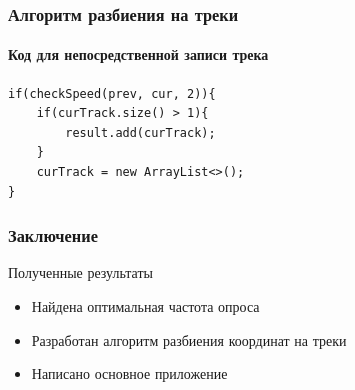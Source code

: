 \documentclass[hyperref={unicode}]{beamer}
\begin{document}
\begin{frame}[fragile]
\frametitle{Алгоритм разбиения на треки}
\framesubtitle{Код для непосредственной записи трека}

\begin{verbatim}
if(checkSpeed(prev, cur, 2)){
    if(curTrack.size() > 1){
        result.add(curTrack);
    }
    curTrack = new ArrayList<>();
}

\end{verbatim}

\end{frame}

\begin{frame}
  \frametitle{Заключение}
  
  Полученные результаты
  
  \begin{itemize}
  	\item Найдена оптимальная частота опроса
  	\item Разработан алгоритм разбиения координат на треки
  	\item Написано основное приложение
  \end{itemize}
  
\end{frame}
\end{document}

